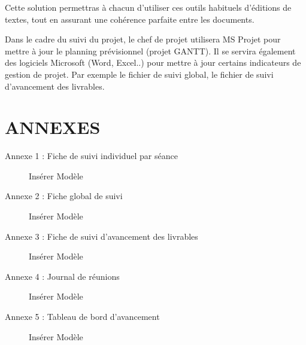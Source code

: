 Cette solution permettras à chacun  d’utiliser ces outils habituels d’éditions de textes, tout en assurant une cohérence parfaite entre les documents.

Dans le cadre du suivi du projet, le chef de projet utilisera MS Projet pour mettre à jour le planning 
prévisionnel (projet GANTT). Il se servira également des logiciels Microsoft (Word, Excel..) pour mettre à jour certains indicateurs de gestion de projet. Par exemple le fichier de suivi global, le fichier de suivi d'avancement des livrables.


\section{ANNEXES}
\begin{description}
\item[Annexe 1 : Fiche de suivi individuel par séance]
    Insérer Modèle
\item[Annexe 2 : Fiche global de suivi]
    Insérer Modèle
\item[Annexe 3 : Fiche de suivi d'avancement des livrables]
    Insérer Modèle
\item[Annexe 4 : Journal de réunions]
    Insérer Modèle
\item[Annexe 5 : Tableau de bord d'avancement]
    Insérer Modèle
\end{description}
